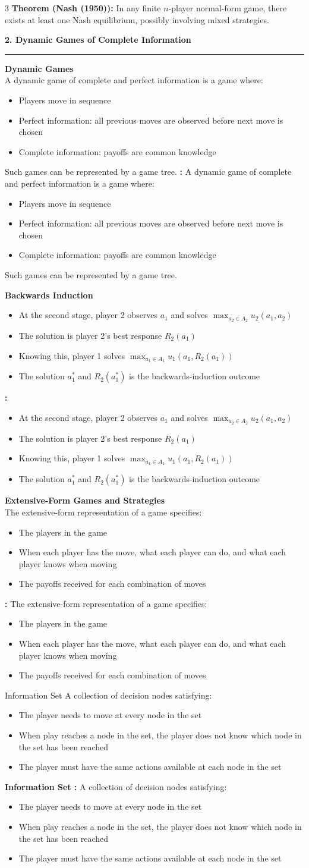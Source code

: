 \documentclass[a4paper,landscape,8pt]{article}
\newcommand{\heading}[1]{\noindent\textbf{\textcolor{heading}{\large #1}}\\\rule{\linewidth}{1pt}}
\newcommand{\subheading}[1]{\vspace{1pt}\noindent\textbf{\textcolor{subheading}{#1}}}
\newcommand{\definition}[2][]{\vspace{1pt}\noindent%
  \ifx\relax#1\relax%
    #2%
  \else%
    \textbf{#1 :} #2%
  \fi}
\newcommand{\theorem}[2]{\vspace{1pt}\noindent\textbf{Theorem (#1):} #2}
\begin{document}
\begin{multicols}{3}
	\theorem{Nash (1950)}{In any finite $n$-player normal-form game, there exists at least one Nash equilibrium, possibly involving mixed strategies.}

	\heading{2. Dynamic Games of Complete Information}

	\subheading{Dynamic Games}\\
	\definition{A dynamic game of complete and perfect information is a game where:
		\begin{itemize}[leftmargin=10pt,itemsep=0pt]
			\item Players move in sequence
			\item Perfect information: all previous moves are observed before next move is chosen
			\item Complete information: payoffs are common knowledge
		\end{itemize}
		Such games can be represented by a game tree.}

	\subheading{Backwards Induction}
	\definition{
		\begin{itemize}[leftmargin=10pt,itemsep=0pt]
			\item At the second stage, player 2 observes $a_1$ and solves $\max_{a_2 \in A_2} u_2(a_1, a_2)$
			\item The solution is player 2's best response $R_2(a_1)$
			\item Knowing this, player 1 solves $\max_{a_1 \in A_1} u_1(a_1, R_2(a_1))$
			\item The solution $a^*_1$ and $R_2(a^*_1)$ is the backwards-induction outcome
		\end{itemize}}

	\subheading{Extensive-Form Games and Strategies}\\
	\definition{The extensive-form representation of a game specifies:
		\begin{itemize}[leftmargin=10pt,itemsep=0pt]
			\item The players in the game
			\item When each player has the move, what each player can do, and what each player knows when moving
			\item The payoffs received for each combination of moves
		\end{itemize}}

	\definition[Information Set]{A collection of decision nodes satisfying:
		\begin{itemize}[leftmargin=10pt,itemsep=0pt]
			\item The player needs to move at every node in the set
			\item When play reaches a node in the set, the player does not know which node in the set has been reached
			\item The player must have the same actions available at each node in the set
		\end{itemize}}


\end{multicols}
\end{document}
